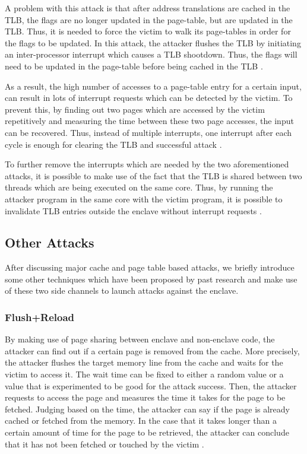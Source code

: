 A problem with this attack is that after address translations are cached in the TLB, the flags are no longer updated in the page-table, but are updated in the TLB. Thus, it is needed to force the victim to walk its page-tables in order for the flags to be updated. In this attack, the attacker flushes the TLB by initiating an inter-processor interrupt which causes a TLB shootdown. Thus, the flags will need to be updated in the page-table before being cached in the TLB \cite{leakycauldron,stealthy}.

As a result, the high number of accesses to a page-table entry for a certain input, can result in lots of interrupt requests which can be detected by the victim. To prevent this, by finding out two pages which are accessed by the victim repetitively and measuring the time between these two page accesses, the input can be recovered. Thus, instead of multiple interrupts, one interrupt after each cycle is enough for clearing the TLB and successful attack \cite{leakycauldron,stealthy}.

To further remove the interrupts which are needed by the two aforementioned attacks, it is possible to make use of the fact that the TLB is shared between two threads which are being executed on the same core. Thus, by running the attacker program in the same core with the victim program, it is possible to invalidate TLB entries outside the enclave without interrupt requests \cite{leakycauldron,stealthy}.

\subsection{Other Attacks}
After discussing major cache and page table based attacks, we briefly introduce some other techniques which have been proposed by past research and make use of these two side channels to launch attacks against the enclave.

\subsubsection{Flush+Reload}
By making use of page sharing between enclave and non-enclave code, the attacker can find out if a certain page is removed from the cache. More precisely, the attacker flushes the target memory line from the cache and waits for the victim to access it. The wait time can be fixed to either a random value or a value that is experimented to be good for the attack success. Then, the attacker requests to access the page and measures the time it takes for the page to be fetched. Judging based on the time, the attacker can say if the page is already cached or fetched from the memory. In the case that it takes longer than a certain amount of time for the page to be retrieved, the attacker can conclude that it has not been fetched or touched by the victim \cite{flushreload}.

